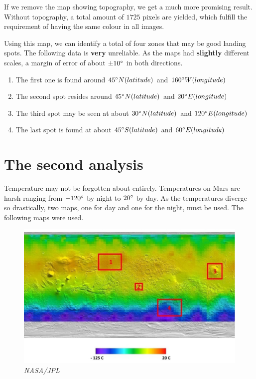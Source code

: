 \documentclass{article}
\newcommand*{\captionsource}[2]{%
    \caption*{%
        \noindent%
        {\fontsize{8pt}{8pt}%
            \selectfont \noindent \null \hfill \emph{#2}%
        }%
        \\\hspace{\linewidth}%
        {\fontsize{10pt}{10pt}%
            \selectfont \noindent \centering{#1}%
        }%
    }%
}
\begin{document}
If we remove the map showing topography, we get a much more promising result.
Without topography, a total amount of \(1725\) pixels are yielded, which fulfill the requirement of having the same colour in all images.

Using this map, we can identify a total of four zones that may be good landing spots.
The following data is \textbf{very} unreliable. As the maps had \textbf{slightly} different scales, a margin of error of about \(\pm 10 \degree\) in both directions.
\begin{enumerate}
\item The first one is found around \(45 \degree N (latitude)\) and \(160 \degree W (longitude) \)
\item The second spot resides around \(45 \degree N (latitude)\) and \(20 \degree E (longitude)\)
\item The third spot may be seen at about \(30 \degree N (latitude)\) and \(120 \degree E (longitude)\)
\item The last spot is found at about \(45 \degree S (latitude)\) and \(60 \degree E (longitude)\)
\end{enumerate}

\section{The second analysis}
\begin{multicols}{3}
Temperature may not be forgotten about entirely.
Temperatures on Mars are harsh ranging from \(-120 \degree\) by night to \(20 \degree\) by day.
As the temperatures diverge so drastically, two maps, one for day and one for the night, must be used.
The following maps were used.

\end{multicols}
\begin{figure}[H]
    \includegraphics[scale=0.5, width=\textwidth]{second/raw//daytime.jpg}
    \captionsource{Temperature by day on Mars}{NASA/JPL}
    \label{fig:tempbyday}
\end{figure}
\end{document}
